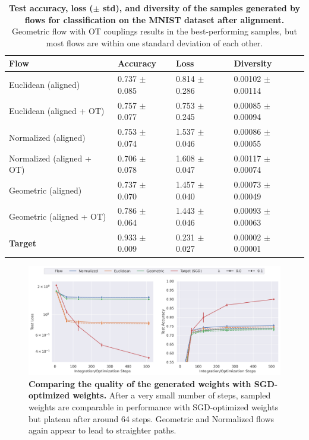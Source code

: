 \begin{table}[t!]
    \centering
    \begin{tabular}{llll}
        \toprule
        \textbf{Flow}  & \textbf{Accuracy} & \textbf{Loss} & \textbf{Diversity} \\
        \midrule 
        Euclidean (aligned)              & 0.737 $\pm$ 0.085	& 0.814 $\pm$ 0.286 & 0.00102 $\pm$ 0.00114 \\
        Euclidean (aligned + OT)          & 0.757 $\pm$ 0.077 & 0.753 $\pm$ 0.245 & 0.00085 $\pm$ 0.00094 \\
        \midrule
        Normalized (aligned)          & 0.753 $\pm$ 0.074	& 1.537 $\pm$ 0.046 & 0.00086 $\pm$ 0.00055 \\
        Normalized (aligned + OT)         & 0.706 $\pm$ 0.078 & 1.608 $\pm$ 0.047 & 0.00117 $\pm$ 0.00074 \\
        \midrule
        Geometric (aligned)               & 0.737 $\pm$ 0.070	& 1.457 $\pm$ 0.040 & 0.00073 $\pm$ 0.00049 \\
        Geometric (aligned + OT)     & 0.786 $\pm$ 0.064 & 1.443 $\pm$ 0.046 & 0.00093 $\pm$ 0.00063 \\
        \midrule
        \textbf{Target}         & 0.933 $\pm$ 0.009 & 0.231 $\pm$ 0.027 & 0.00002 $\pm$ 0.00001  \\
        \bottomrule
    \end{tabular}
    \caption{\label{tab:mnist_class_table}\textbf{Test accuracy, loss ($\pm$ std), and diversity of the samples generated by flows for classification on the MNIST dataset after alignment.} Geometric flow with OT couplings results in the best-performing samples, but most flows are within one standard deviation of each other. }
\end{table}

\begin{figure}[t!]
    \centering
    \includegraphics[width=\linewidth]{figures/mnist/mnist_steps_both.png}
    \caption{\label{fig:mnist_steps}\textbf{Comparing the quality of the generated weights with SGD-optimized weights.} After a very small number of steps, sampled weights are comparable in performance with SGD-optimized weights but plateau after around 64 steps. Geometric and Normalized flows again appear to lead to straighter paths.} 
\end{figure}


